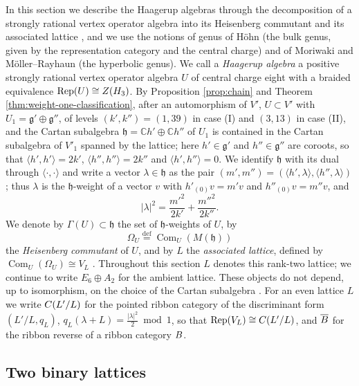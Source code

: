 \documentclass[leqno]{article}
\newcommand{\Cbb}{\ensuremath{\mathbb{C}}}
\let\cal\relax
\newcommand{\cal}{\mathcal}
\newcommand{\la}{\langle}
\newcommand{\ra}{\rangle}
\newcommand{\ov}{\overset}
\DeclareMathOperator{\Rep}{Rep}
\numberwithin{equation}{section}
\begin{document}
In this section we describe the Haagerup algebras through the decomposition of a strongly rational vertex operator algebra into its Heisenberg commutant and its associated lattice \cite{Mas14,Hoh17,MoR24a}, and we use the notions of genus of Höhn \cite{Hoh03} (the bulk genus, given by the representation category and the central charge) and of Moriwaki \cite{Mor21} and Möller--Rayhaun \cite{MoR24a} (the hyperbolic genus). We call a \emph{Haagerup algebra} a positive strongly rational vertex operator algebra $U$ of central charge eight with a braided equivalence $\Rep(U) \cong Z(\cal H_3)$. By Proposition \ref{prop:chain} and Theorem \ref{thm:weight-one-classification}, after an automorphism of $V'$, $U \subset V'$ with $U_1 = \mathfrak g' \oplus \mathfrak g''$, of levels $(k',k'') = (1,39)$ in case (I) and $(3,13)$ in case (II), and the Cartan subalgebra $\mathfrak h = \Cbb h' \oplus \Cbb h''$ of $U_1$ is contained in the Cartan subalgebra of $V'_1$ spanned by the lattice; here $h' \in \mathfrak g'$ and $h'' \in \mathfrak g''$ are coroots, so that $\la h',h'\ra = 2k'$, $\la h'',h''\ra = 2k''$ and $\la h',h''\ra = 0$. We identify $\mathfrak h$ with its dual through $\la\cdot,\cdot\ra$ and write a vector $\lambda \in \mathfrak h$ as the pair $(m',m'') = (\la h',\lambda\ra,\la h'',\lambda\ra)$; thus $\lambda$ is the $\mathfrak h$-weight of a vector $v$ with $h'_{(0)}v = m'v$ and $h''_{(0)}v = m''v$, and
\[
|\lambda|^2 = \frac{m'^2}{2k'}+\frac{m''^2}{2k''}.
\]
We denote by $\Gamma(U) \subset \mathfrak h$ the set of $\mathfrak h$-weights of $U$, by
\[
\Omega_U \ov{\mathrm{def}}{=} \operatorname{Com}_U(M(\mathfrak h))
\]
the \emph{Heisenberg commutant} of $U$, and by $L$ the \emph{associated lattice}, defined by $\operatorname{Com}_U(\Omega_U) \cong V_L$ \cite[Definition 2.12]{MoR24a}. Throughout this section $L$ denotes this rank-two lattice; we continue to write $E_6 \oplus A_2$ for the ambient lattice. These objects do not depend, up to isomorphism, on the choice of the Cartan subalgebra \cite[Remark 2.13]{MoR24a}. For an even lattice $L$ we write $\cal C(L'/L)$ for the pointed ribbon category of the discriminant form $(L'/L,q_L)$, $q_L(\lambda+L) = \frac{|\lambda|^2}2 \bmod 1$, so that $\Rep(V_L) \cong \cal C(L'/L)$, and $\overline{\cal B}$ for the ribbon reverse of a ribbon category $\cal B$.

\subsection{Two binary lattices}
\end{document}
